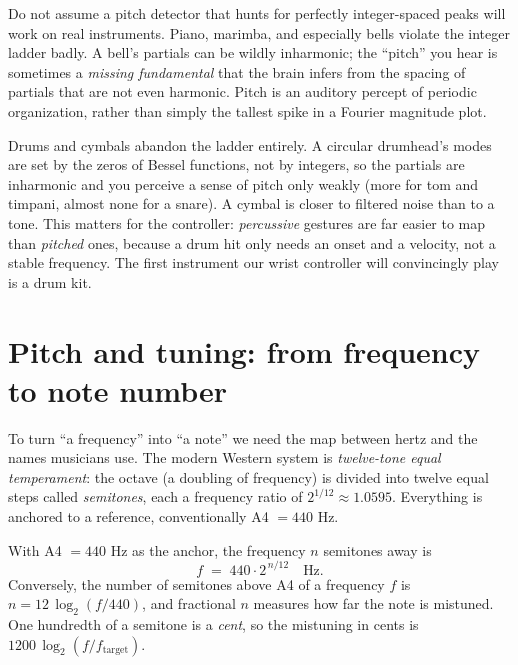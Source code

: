 \begin{trapbox}
Do not assume a pitch detector that hunts for perfectly integer-spaced peaks will work on real
instruments. Piano, marimba, and especially bells violate the integer ladder badly. A bell's partials
can be wildly inharmonic; the ``pitch'' you hear is sometimes a \emph{missing fundamental} that the
brain infers from the spacing of partials that are not even harmonic. Pitch is an auditory
percept of periodic organization, rather than simply the tallest spike in a Fourier magnitude plot.
\end{trapbox}

\begin{applicationbox}
Drums and cymbals abandon the ladder entirely. A circular drumhead's modes are set by the zeros of
Bessel functions, not by integers, so the partials are inharmonic and you perceive a sense of pitch
only weakly (more for tom and timpani, almost none for a snare). A cymbal is closer to filtered noise
than to a tone. This matters for the controller: \emph{percussive} gestures are far easier to map
than \emph{pitched} ones, because a drum hit only needs an onset and a velocity, not a stable
frequency. The first instrument our wrist controller will convincingly play is a drum kit.
\end{applicationbox}

\section{Pitch and tuning: from frequency to note number}
\label{ch29:pitch-tuning}

To turn ``a frequency'' into ``a note'' we need the map between hertz and the names musicians use. The
modern Western system is \emph{twelve-tone equal temperament}: the octave (a doubling of frequency)
is divided into twelve equal steps called \emph{semitones}, each a frequency ratio of $2^{1/12}
\approx 1.0595$. Everything is anchored to a reference, conventionally A4 $= 440$ Hz.

\begin{definition}
\label{ch29:def-et}
With A4 $= 440$ Hz as the anchor, the frequency $n$ semitones away is
\[
  f \;=\; 440 \cdot 2^{\,n/12} \quad\text{Hz}.
\]
Conversely, the number of semitones above A4 of a frequency $f$ is $n = 12\,\log_2(f/440)$, and
fractional $n$ measures how far the note is mistuned. One hundredth of a semitone is a \emph{cent}, so
the mistuning in cents is $1200\,\log_2(f/f_{\text{target}})$.
\end{definition}

